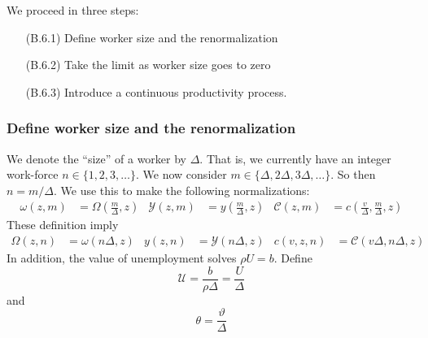 We proceed in three steps:

\begin{enumerate}
\item[(B.6.1)] Define worker size and the renormalization

\item[(B.6.2)] Take the limit as worker size goes to zero

\item[(B.6.3)] Introduce a continuous productivity process.
\end{enumerate}

\subsubsection{Define worker size and the renormalization}

We denote the ``size'' of a worker by $\Delta$.
That is, we currently have an integer work-force $n\in \{1,2,3,\dots\}$.
We now consider $m \in \{\Delta,2\Delta,3\Delta,\dots\}$.
So then $n = m/\Delta$.
We use this to make the following normalizations:
\begin{align*}
\omega(z,m) &= \Omega \left( \frac{m}{\Delta}, z \right) & \mathcal{Y}(z,m) &= y \left( \frac{m}{\Delta}, z \right) & \mathcal{C}(z,m) &= c \left( \frac{v}{\Delta} ,\frac{m}{\Delta}, z \right)
\end{align*}
These definition imply
\begin{align*}
\Omega(z,n) &= \omega(n\Delta,z) &
y(z,n) &= \mathcal{Y}(n\Delta,z) &
c(v,z,n) &= \mathcal{C}(v\Delta,n\Delta,z)
\end{align*}
In addition, the value of unemployment solves $\rho U = b$. Define
\begin{equation*}
\mathcal{U} = \frac{b}{\rho \Delta} = \frac{U}{\Delta}
\end{equation*}
and
\begin{equation*}
\theta = \frac{\vartheta}{\Delta}
\end{equation*}

